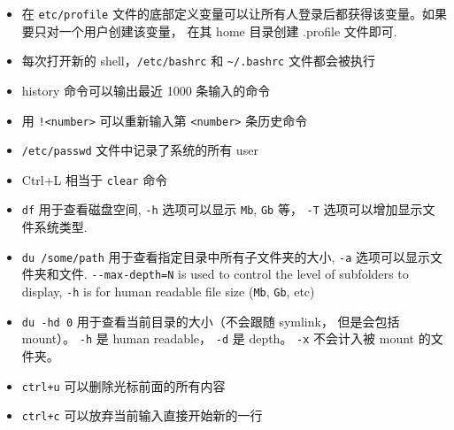 \begin{itemize}
\item 在 \verb`etc/profile` 文件的底部定义变量可以让所有人登录后都获得该变量。如果要只对一个用户创建该变量， 在其 home 目录创建 .profile 文件即可.
\item 每次打开新的 shell，\verb`/etc/bashrc` 和 \verb`~/.bashrc` 文件都会被执行
\item history 命令可以输出最近 1000 条输入的命令
\item 用 \verb`!<number>` 可以重新输入第 \verb`<number>` 条历史命令
\item \verb`/etc/passwd` 文件中记录了系统的所有 user
\item Ctrl+L 相当于 \verb`clear` 命令
\item \verb`df` 用于查看磁盘空间, \verb`-h` 选项可以显示 \verb`Mb`, \verb`Gb` 等， \verb|-T| 选项可以增加显示文件系统类型.
\item \verb`du /some/path` 用于查看指定目录中所有子文件夹的大小, \verb`-a` 选项可以显示文件夹和文件. \verb`--max-depth=N` is used to control the level of subfolders to display, \verb`-h` is for human readable file size (\verb`Mb`, \verb`Gb`, etc)
\item \verb|du -hd 0| 用于查看当前目录的大小（不会跟随 symlink， 但是会包括 mount）。 \verb|-h| 是 human readable， \verb|-d| 是 depth。 \verb|-x| 不会计入被 mount 的文件夹。
\item \verb`ctrl+u` 可以删除光标前面的所有内容
\item \verb`ctrl+c` 可以放弃当前输入直接开始新的一行
\end{itemize}

